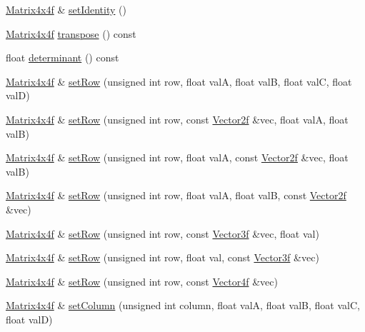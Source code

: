 \begin{DoxyCompactItemize}
\item 
\hyperlink{classh2_1_1_matrix4x4f}{Matrix4x4f} \& \hyperlink{classh2_1_1_matrix4x4f_af07e09b8ebc7b235103716c107e435f7}{set\-Identity} ()
\item 
\hyperlink{classh2_1_1_matrix4x4f}{Matrix4x4f} \hyperlink{classh2_1_1_matrix4x4f_a4e1dab45355f08a2395b150635f6218c}{transpose} () const 
\item 
float \hyperlink{classh2_1_1_matrix4x4f_ac309345e8d319af38c5d6bbb29b9bc93}{determinant} () const 
\item 
\hyperlink{classh2_1_1_matrix4x4f}{Matrix4x4f} \& \hyperlink{classh2_1_1_matrix4x4f_a1bc9e4283e9a533a51e6832380357e91}{set\-Row} (unsigned int row, float val\-A, float val\-B, float val\-C, float val\-D)
\item 
\hyperlink{classh2_1_1_matrix4x4f}{Matrix4x4f} \& \hyperlink{classh2_1_1_matrix4x4f_a2c85b0aa38cf6e232b963e5df2052c4c}{set\-Row} (unsigned int row, const \hyperlink{classh2_1_1_vector2f}{Vector2f} \&vec, float val\-A, float val\-B)
\item 
\hyperlink{classh2_1_1_matrix4x4f}{Matrix4x4f} \& \hyperlink{classh2_1_1_matrix4x4f_ab226ab5f2f26405e71646bb5648cc35f}{set\-Row} (unsigned int row, float val\-A, const \hyperlink{classh2_1_1_vector2f}{Vector2f} \&vec, float val\-B)
\item 
\hyperlink{classh2_1_1_matrix4x4f}{Matrix4x4f} \& \hyperlink{classh2_1_1_matrix4x4f_a7a35d16612d4e33b9f32f7749029e2ce}{set\-Row} (unsigned int row, float val\-A, float val\-B, const \hyperlink{classh2_1_1_vector2f}{Vector2f} \&vec)
\item 
\hyperlink{classh2_1_1_matrix4x4f}{Matrix4x4f} \& \hyperlink{classh2_1_1_matrix4x4f_aaeb5995948dd2a0bd0548599fade68ce}{set\-Row} (unsigned int row, const \hyperlink{classh2_1_1_vector3f}{Vector3f} \&vec, float val)
\item 
\hyperlink{classh2_1_1_matrix4x4f}{Matrix4x4f} \& \hyperlink{classh2_1_1_matrix4x4f_a7a8f5b2770891b93f98aa3ad0db949b0}{set\-Row} (unsigned int row, float val, const \hyperlink{classh2_1_1_vector3f}{Vector3f} \&vec)
\item 
\hyperlink{classh2_1_1_matrix4x4f}{Matrix4x4f} \& \hyperlink{classh2_1_1_matrix4x4f_a050a2d7727ee0799b60d91aaf5bb429c}{set\-Row} (unsigned int row, const \hyperlink{classh2_1_1_vector4f}{Vector4f} \&vec)
\item 
\hyperlink{classh2_1_1_matrix4x4f}{Matrix4x4f} \& \hyperlink{classh2_1_1_matrix4x4f_a4a32f65b4ae04871247ae226a8906377}{set\-Column} (unsigned int column, float val\-A, float val\-B, float val\-C, float val\-D)

\end{DoxyCompactItemize}
